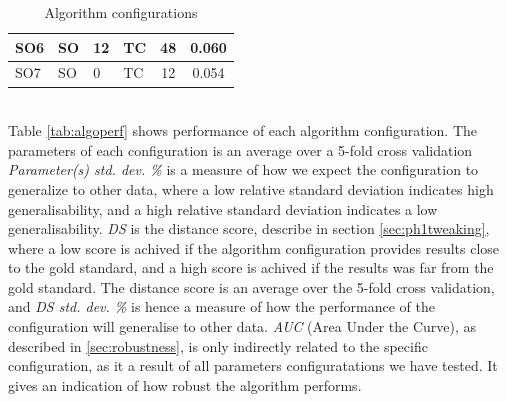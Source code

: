 \begin{table}[!ht]
\begin{tabular}{| l | l | p{2cm} | p{2cm} | c | c | }
    SO6 & SO & 12 & TC & 48 & 0.060 \\\hline
    SO7 & SO & 0 & TC & 12 & 0.054 \\\hline%
%
%
  \end{tabular}
\caption{Algorithm configurations}
\label{tab:algoconfigs}
\end{table}\\
%
Table \ref{tab:algoperf} shows performance of each algorithm configuration. The parameters of each configuration is an average over a 5-fold cross validation \textit{Parameter(s) std. dev. \%} is a measure of how we expect the configuration to generalize to other data, where a low relative standard deviation indicates high generalisability, and a high relative standard deviation indicates a low generalisability. \textit{DS} is the distance score, describe in section \ref{sec:ph1tweaking}, where a low score is achived if the algorithm configuration provides results close to the gold standard, and a high score is achived if the results was far from the gold standard. The distance score is an average over the 5-fold cross validation, and \textit{DS std. dev. \%} is hence a measure of how the performance of the configuration will generalise to other data. \textit{AUC} (Area Under the Curve), as described in \ref{sec:robustness}, is only indirectly related to the specific configuration, as it a result of all parameters configuratations we have tested. It gives an indication of how robust the algorithm performs.
%
